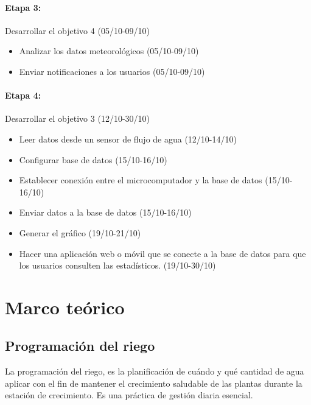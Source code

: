 \documentclass[11pt,letterpaper]{article}
\begin{document}
\paragraph{Etapa 3:} Desarrollar el objetivo 4 (05/10-09/10)
\begin{itemize}
\item Analizar los datos meteorológicos (05/10-09/10)
\item Enviar notificaciones a los usuarios (05/10-09/10)
\end{itemize}

\paragraph{Etapa 4:} Desarrollar el objetivo 3 (12/10-30/10)
\begin{itemize}
\item Leer datos desde un sensor de flujo de agua (12/10-14/10)
\item Configurar base de datos (15/10-16/10)
\item Establecer conexión entre el microcomputador y la base de datos (15/10-16/10)
\item Enviar datos a la base de datos (15/10-16/10)
\item Generar el gráfico (19/10-21/10)
\item Hacer una aplicación web o móvil que se conecte a la base de datos para que los usuarios consulten las estadísticos. (19/10-30/10)
\end{itemize}

\newpage


\section{Marco teórico}


\subsection{Programación del riego}

La programación del riego, es la planificación de cuándo y qué cantidad de agua aplicar con el fin de mantener el crecimiento saludable de las plantas durante la estación de crecimiento. Es una práctica de gestión diaria esencial.
\end{document}
